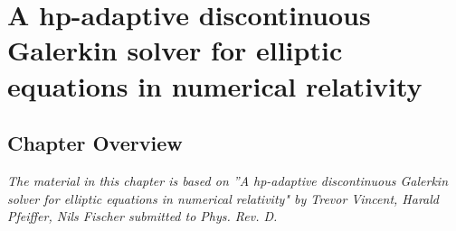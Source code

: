 \chapter{A hp-adaptive discontinuous Galerkin solver for elliptic equations in numerical relativity}

\section{Chapter Overview}

\textit{The material in this chapter is based on ”A hp-adaptive discontinuous Galerkin solver for elliptic equations in numerical relativity" by Trevor Vincent, Harald Pfeiffer, Nils Fischer submitted to Phys. Rev. D.}
